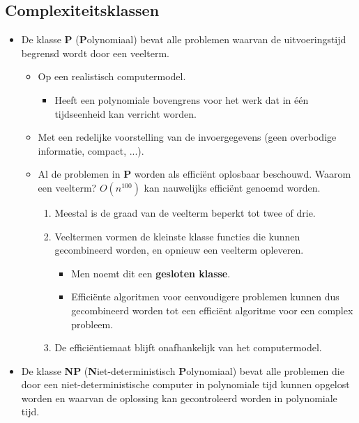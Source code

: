 \subsection{Complexiteitsklassen}
\begin{itemize}
    \item De klasse \textbf{P} (\textbf{P}olynomiaal) bevat alle problemen waarvan de uitvoeringstijd begrensd wordt door een veelterm.
    \begin{itemize}
        \item Op een realistisch computermodel.
        \begin{itemize}
            \item Heeft een polynomiale bovengrens voor het werk dat in één tijdseenheid kan verricht worden.
        \end{itemize}
        \item Met een redelijke voorstelling van de invoergegevens (geen overbodige informatie, compact, ...).
        \item Al de problemen in \textbf{P} worden als efficiënt oplosbaar beschouwd.
        \alert Waarom een veelterm? $O(n^{100})$ kan nauwelijks efficiënt genoemd worden.
        \begin{enumerate}
            \item Meestal is de graad van de veelterm beperkt tot twee of drie.
            \item Veeltermen vormen de kleinste klasse functies die kunnen gecombineerd worden, en opnieuw een veelterm opleveren.
            \begin{itemize}
                \item Men noemt dit een \textbf{gesloten klasse}.
                \item Efficiënte algoritmen voor eenvoudigere problemen kunnen dus gecombineerd worden tot een efficiënt algoritme voor een complex probleem.
            \end{itemize}
            \item De efficiëntiemaat blijft onafhankelijk van het computermodel.
        \end{enumerate}
    \end{itemize}
    \item De klasse \textbf{NP} (\textbf{N}iet-deterministisch \textbf{P}olynomiaal) bevat alle problemen die door een niet-deterministische computer in polynomiale tijd kunnen opgelost worden en waarvan de oplossing kan gecontroleerd worden in polynomiale tijd.
    \begin{itemize}

\end{itemize}
\end{itemize}
